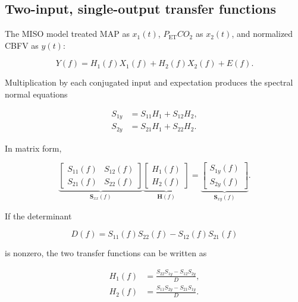\documentclass[12pt]{article}
\newcommand{\PETCOtwo}{P_{\mathrm{ET}}CO_2}
\begin{document}
\subsection{Two-input, single-output transfer functions}

The MISO model treated MAP as $x_1(t)$, $\PETCOtwo$ as $x_2(t)$, and normalized
CBFV as $y(t)$:

\begin{equation}
    Y(f)=H_1(f)X_1(f)+H_2(f)X_2(f)+E(f).
    \label{eq:miso_model}
\end{equation}

Multiplication by each conjugated input and expectation produces the spectral
normal equations

\begin{align}
    S_{1y} &= S_{11}H_1+S_{12}H_2,\\
    S_{2y} &= S_{21}H_1+S_{22}H_2.
\end{align}

In matrix form,

\begin{equation}
    \underbrace{
    \begin{bmatrix}
        S_{11}(f) & S_{12}(f)\\
        S_{21}(f) & S_{22}(f)
    \end{bmatrix}}_{\mathbf{S}_{xx}(f)}
    \underbrace{
    \begin{bmatrix}
        H_1(f)\\H_2(f)
    \end{bmatrix}}_{\mathbf{H}(f)}
    =
    \underbrace{
    \begin{bmatrix}
        S_{1y}(f)\\S_{2y}(f)
    \end{bmatrix}}_{\mathbf{S}_{xy}(f)}.
    \label{eq:miso_matrix}
\end{equation}

If the determinant

\begin{equation}
    D(f)=S_{11}(f)S_{22}(f)-S_{12}(f)S_{21}(f)
\end{equation}

is nonzero, the two transfer functions can be written as

\begin{align}
    H_1(f)&=\frac{S_{22}S_{1y}-S_{12}S_{2y}}{D},
    \label{eq:h1_explicit}\\
    H_2(f)&=\frac{S_{11}S_{2y}-S_{21}S_{1y}}{D}.
    \label{eq:h2_explicit}
\end{align}
\end{document}
